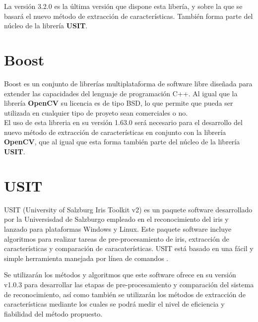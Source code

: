 La versión 3.2.0 es la última versión que dispone esta libería, y sobre la que se basará el nuevo método de extracción de características. También forma parte del núcleo de la librería \textbf{USIT}.


\section{Boost}

Boost es un conjunto de librerías multiplataforma de software libre diseñada para extender las capacidades del lenguaje de programación C++. Al igual que la librería \textbf{OpenCV} su licencia es de tipo BSD, lo que permite que pueda ser utilizada en cualquier tipo de proyeto sean comerciales o no. \\

El uso de esta libreria en su versión 1.63.0 será necesario para el desarrollo del nuevo método de extracción de características en conjunto con la librería \textbf{OpenCV}, que al igual que esta forma también parte del núcleo de la librería \textbf{USIT}. \\



\section{USIT}

USIT (University of Salzburg Iris Toolkit v2) es un paquete software desarrollado por la Universisdad de Salzburgo empleado en el reconocimiento del iris y lanzado para plataformas Windows y Linux. Este paquete software incluye algoritmos para realizar tareas de pre-procesamiento de iris, extracción de características y comparación de caracaterísticas. USIT está basado en una fácil y simple herramienta manejada por línea de comandos \cite{Reference18} \cite{Reference19}.

Se utilizarán los métodos y algoritmos que este software ofrece en su versión v1.0.3 para desarrollar las etapas de pre-procesamiento y comparación del sistema de reconocimiento, así como también se utilizarán los métodos de extracción de características mediante los cuales se podrá medir el nivel de eficiencia y fiabilidad del método propuesto. \\

